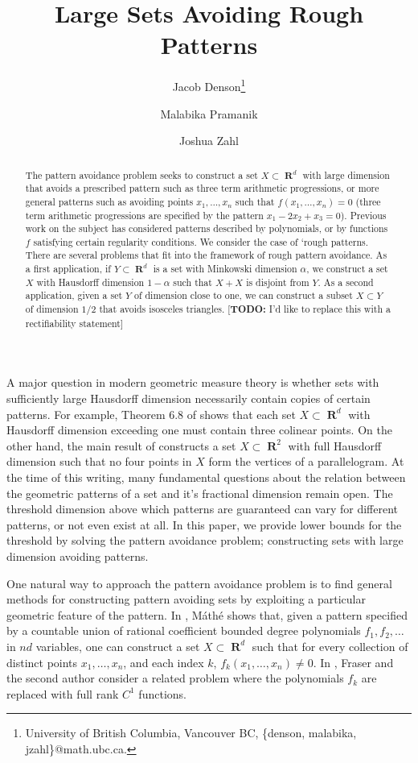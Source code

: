 \documentclass[dvipsnames,letterpaper,12pt]{article}
\title{Large Sets Avoiding Rough Patterns}
\author{Jacob Denson\thanks{University of British Columbia, Vancouver BC, \{denson, malabika, jzahl\}@math.ubc.ca.} \and Malabika Pramanik\footnotemark[1] \and Joshua Zahl\footnotemark[1]}
\numberwithin{equation}{section}
\theoremstyle{plain}
\DeclareMathOperator{\RR}{\mathbf{R}}
\begin{document}
\maketitle

\begin{abstract}
	The pattern avoidance problem seeks to construct a set $X\subset \RR^d$ with large dimension that avoids a prescribed pattern such as three term arithmetic progressions, or more general patterns such as avoiding points $x_1, \dots, x_n$ such that $f(x_1, \dots, x_n) = 0$ (three term arithmetic progressions are specified by the pattern $x_1 - 2x_2 + x_3 = 0$). Previous work on the subject has considered patterns described by polynomials, or by functions $f$ satisfying certain regularity conditions. We consider the case of `rough patterns.
	There are several problems that fit into the framework of rough pattern avoidance. As a first application, if $Y \subset \RR^d$ is a set with Minkowski dimension $\alpha$, we construct a set $X$ with Hausdorff dimension $1-\alpha$ such that $X+X$ is disjoint from $Y$. As a second application, given a set $Y$ of dimension close to one, we can construct a subset $X \subset Y$ of dimension $1/2$ that avoids isosceles triangles. [{\bf{TODO:}} I'd like to replace this with a rectifiability statement]
\end{abstract}








A major question in modern geometric measure theory is whether sets with sufficiently large Hausdorff dimension necessarily contain copies of certain patterns. For example, Theorem 6.8 of \cite{Matilla} shows that each set $X \subset \RR^d$ with Hausdorff dimension exceeding one must contain three colinear points. On the other hand, the main result of \cite{Maga} constructs a set $X \subset \RR^2$ with full Hausdorff dimension such that no four points in $X$ form the vertices of a parallelogram. At the time of this writing, many fundamental questions about the relation between the geometric patterns of a set and it's fractional dimension remain open. The threshold dimension above which patterns are guaranteed can vary for different patterns, or not even exist at all. In this paper, we provide lower bounds for the threshold by solving the pattern avoidance problem; constructing sets with large dimension avoiding patterns.

One natural way to approach the pattern avoidance problem is to find general methods for constructing pattern avoiding sets by exploiting a particular geometric feature of the pattern. In \cite{Mathe}, M\'{a}th\'{e} shows that, given a pattern specified by a countable union of rational coefficient bounded degree polynomials $f_1, f_2, \dots$ in $nd$ variables, one can construct a set $X \subset \RR^d$ such that for every collection of distinct points $x_1, \dots, x_n$, and each index $k$, $f_k(x_1, \dots, x_n) \neq 0$. In \cite{MalabikaRob}, Fraser and the second author consider a related problem where the polynomials $f_k$ are replaced with full rank $C^1$ functions.
\end{document}
